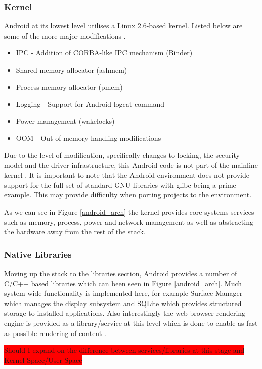 \subsubsection{Kernel}
Android at its lowest level utilises a Linux 2.6-based kernel. Listed below are some of the more major modifications \cite{elinuxandroidkernel}. 

\begin{itemize}
\item IPC - Addition of CORBA-like IPC mechanism (Binder)
\item Shared memory allocator (ashmem)
\item Process memory allocator (pmem)
\item Logging - Support for Android logcat command
\item Power management (wakelocks) 
\item OOM - Out of memory handling modifications
\end{itemize}


Due to the level of modification, specifically changes to locking, the security model and the driver infrastructure, this Android code is not part of the mainline kernel \cite{registerAndroidKernel10}. It is important to note that the Android environment does not provide support for the full set of standard GNU libraries with glibc being a prime example. This may provide difficulty when porting projects to the environment.


As we can see in Figure \ref{android_arch} the kernel provides core systems services such as memory, process, power and network management as well as abstracting the hardware away from the rest of the stack.

\subsubsection{Native Libraries}
Moving up the stack to the libraries section, Android provides a number of C/C++ based libraries which can been seen in Figure \ref{android_arch}. Much system wide functionality is implemented here, for example Surface Manager which manages the display subsystem and SQLite which provides structured storage to installed applications. Also interestingly the web-browser rendering engine is provided as a library/service at this level which is done to enable as fast as possible rendering of content \cite{googioanatomy08}. 

\colorbox{red}{Should I expand on the difference between services/libraries at this stage and Kernel Space/User Space}


